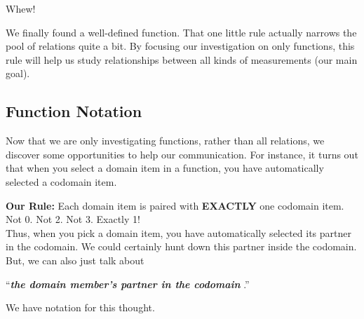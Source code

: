 \documentclass{ximera}
\begin{document}
Whew!  

We finally found a well-defined function. That one little rule actually narrows the pool of relations quite a bit.  By focusing our investigation on only functions, this rule will help us study relationships between all kinds of measurements (our main goal). \\












\subsection*{Function Notation}

Now that we are only investigating functions, rather than all relations, we discover some opportunities to help our communication.  For instance, it turns out that when you select a domain item in a function, you have automatically selected a codomain item.

\textbf{Our Rule:} Each domain item is paired with \textbf{\textcolor{purple!85!blue}{EXACTLY}} one codomain item.  Not 0. Not 2.  Not 3.  Exactly 1!  \\


Thus, when you pick a domain item, you have automatically selected its partner in the codomain.  We could certainly hunt down this partner inside the codomain.  But, we can also just talk about 






\begin{center}
``\textit{\textbf{\textcolor{blue!55!black}{the domain member's partner in the codomain}} }.'' 
\end{center}



We have notation for this thought. \\
\end{document}
